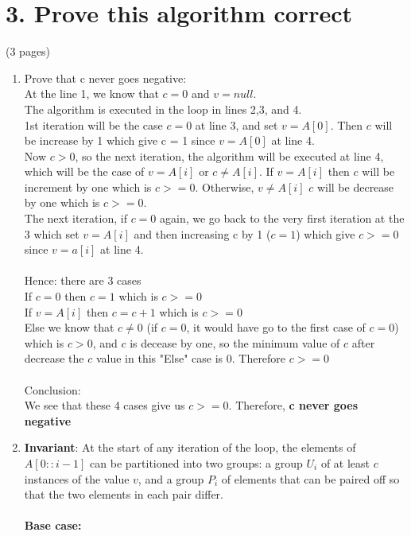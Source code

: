 \documentclass[11pt]{article}
\newenvironment{qparts}{\begin{enumerate}[{(}a{)}]}{\end{enumerate}}
\begin{document}
\section*{3. Prove this algorithm correct} (3 pages)\\
\begin{qparts}
\item
\Large{Prove that c never goes negative:}\\
At the line 1, we know that $c = 0$ and $v = null$.\\
The algorithm is executed in the loop in lines 2,3, and 4.\\
1st iteration will be the case $c = 0$ at line 3, and set $v = A[0]$. Then $c$ will be increase by 1 which give c = 1 since $v = A[0]$ at line 4.\\
Now $c > 0$, so the next iteration, the algorithm will be executed at line 4, which will be the case of $v = A[i]$ or $c \neq A[i]$. If $v = A[i]$ then $c$ will be increment by one which is $c >= 0$. Otherwise, $v \neq A[i]$ $c$ will be decrease by one which is $c >= 0$.\\
The next iteration, if $c = 0$ again, we go back to the very first iteration at the 3 which set $v = A[i]$ and then increasing c by 1 ($c = 1$) which give $c >= 0$ since $v = a[i]$ at line 4.\\\\
Hence: there are 3 cases\\
If $c = 0$ then $c = 1$ which is $c >= 0$\\
If $v = A[i]$ then $c = c + 1$ which is $c >= 0$\\
Else we know that $c \neq 0$ (if $c = 0$, it would have go to the first case of $c = 0$) which is $c >0$, and $c$ is decease by one, so the minimum value of $c$ after decrease the $c$ value in this "Else" case is 0. Therefore $c >= 0$\\\\
\Large{Conclusion:}\\
We see that these 4 cases give us $c >=0$. Therefore, \textbf{c never goes negative}\\
%
\item
\Large{\textbf{Invariant}}:
At the start of any iteration of the loop, the elements of $A[0::i-1]$ can be partitioned into two groups: a group $U_i$ of at least $c$ instances of the value $v$, and a group $P_i$ of elements that can be paired off so that the two elements in each pair differ.\\\\
\textbf{\Large{Base case:}} %

\end{qparts}
\end{document}
